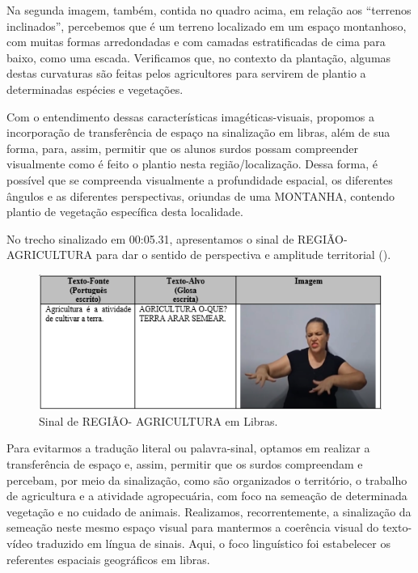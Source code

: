 \documentclass[portuguese]{textolivre}
\begin{document}
Na segunda imagem, também, contida no quadro acima, em relação aos “terrenos inclinados”, percebemos que é um terreno localizado em um espaço montanhoso, com muitas formas arredondadas e com camadas estratificadas de cima para baixo, como uma escada. Verificamos que, no contexto da plantação, algumas destas curvaturas são feitas pelos agricultores para servirem de plantio a determinadas espécies e vegetações. 

Com o entendimento dessas características imagéticas-visuais, propomos a incorporação de transferência de espaço na sinalização em libras, além de sua forma, para, assim, permitir que os alunos surdos possam compreender visualmente como é feito o plantio nesta região/localização. Dessa forma, é possível que se compreenda visualmente a profundidade espacial, os diferentes ângulos e as diferentes perspectivas, oriundas de uma MONTANHA, contendo plantio de vegetação específica desta localidade.

No trecho sinalizado em 00:05.31, apresentamos o sinal de REGIÃO- AGRICULTURA para dar o sentido de perspectiva e amplitude territorial ().

\begin{figure}[h!]
    \centering
    \begin{minipage}{0.85\linewidth}
    \includegraphics[width=\linewidth]{Fig8.png}
    \caption{Sinal de REGIÃO- AGRICULTURA em Libras.}
    \label{fig8}
    \end{minipage}
\end{figure}

Para evitarmos a tradução literal ou palavra-sinal, optamos em realizar a transferência de espaço e, assim, permitir que os surdos compreendam e percebam, por meio da sinalização, como são organizados o território, o trabalho de agricultura e a atividade agropecuária, com foco na semeação de determinada vegetação e no cuidado de animais. Realizamos, recorrentemente, a sinalização da semeação neste mesmo espaço visual para mantermos a coerência visual do texto-vídeo traduzido em língua de sinais. Aqui, o foco linguístico foi estabelecer os referentes espaciais geográficos em libras.
\end{document}
